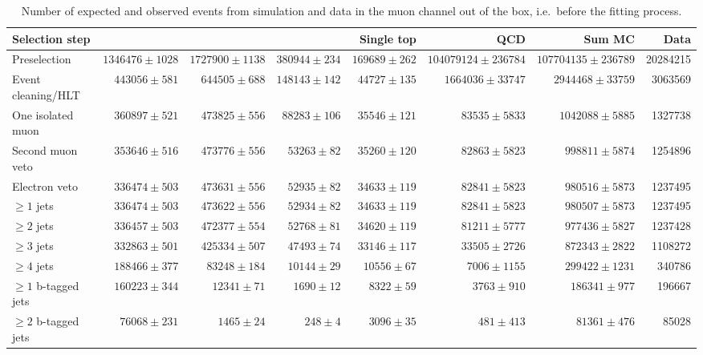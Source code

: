 \begin{table}
  \centering
   \caption[Number of expected and observed events from simulation and data in the muon channel]{Number of expected and
   observed events from simulation and data in the muon channel out of the box, i.e.\ before the fitting process.}
    \label{tab:event_yields_mujets}
    \resizebox{\columnwidth}{!} {
    \begin{tabular}{@{}lrrrrrrr@{}}
    \toprule
	\textbf{Selection step} & \textbf{\ttjets} & \textbf{\WpJets} & \textbf{\ZpJets} & \textbf{Single top} & \textbf{QCD} & \textbf{Sum MC} & \textbf{Data} \\
	\midrule
	Preselection  &  $1346476 \pm 1028$ &  $1727900 \pm 1138$ &  $380944 \pm 234$ &  $169689 \pm 262$ &  $104079124 \pm 236784$ &  $107704135 \pm 236789$ &  20284215 \\ 
	Event cleaning/HLT  &  $443056 \pm 581$ &  $644505 \pm 688$ &  $148143 \pm 142$ &  $44727 \pm 135$ &  $1664036 \pm 33747$ &  $2944468 \pm 33759$ &  3063569 \\ 
	One isolated muon  &  $360897 \pm 521$ &  $473825 \pm 556$ &  $88283 \pm 106$ &  $35546 \pm 121$ &  $83535 \pm 5833$ &  $1042088 \pm 5885$ &  1327738 \\ 
	Second muon veto  &  $353646 \pm 516$ &  $473776 \pm 556$ &  $53263 \pm 82$ &  $35260 \pm 120$ &  $82863 \pm 5823$ &  $998811 \pm 5874$ &  1254896 \\ 
	Electron veto  &  $336474 \pm 503$ &  $473631 \pm 556$ &  $52935 \pm 82$ &  $34633 \pm 119$ &  $82841 \pm 5823$ &  $980516 \pm 5873$ &  1237495 \\ 
	$\geq 1$ jets  &  $336474 \pm 503$ &  $473622 \pm 556$ &  $52934 \pm 82$ &  $34633 \pm 119$ &  $82841 \pm 5823$ &  $980507 \pm 5873$ &  1237495 \\ 
	$\geq 2$ jets  &  $336457 \pm 503$ &  $472377 \pm 554$ &  $52768 \pm 81$ &  $34620 \pm 119$ &  $81211 \pm 5777$ &  $977436 \pm 5827$ &  1237428 \\ 
	$\geq 3$ jets  &  $332863 \pm 501$ &  $425334 \pm 507$ &  $47493 \pm 74$ &  $33146 \pm 117$ &  $33505 \pm 2726$ &  $872343 \pm 2822$ &  1108272 \\ 
	$\geq 4$ jets  &  $188466 \pm 377$ &  $83248 \pm 184$ &  $10144 \pm 29$ &  $10556 \pm 67$ &  $7006 \pm 1155$ &  $299422 \pm 1231$ &  340786 \\ 
	$\geq 1$ b-tagged jets  &  $160223 \pm 344$ &  $12341 \pm 71$ &  $1690 \pm 12$ &  $8322 \pm 59$ &  $3763 \pm 910$ &  $186341 \pm 977$ &  196667 \\ 
	$\geq 2$ b-tagged jets  &  $76068 \pm 231$ &  $1465 \pm 24$ &  $248 \pm 4$ &  $3096 \pm 35$ &  $481 \pm 413$ &  $81361 \pm 476$ &  85028 \\ 
	\bottomrule
	\end{tabular}
	}
\end{table}

